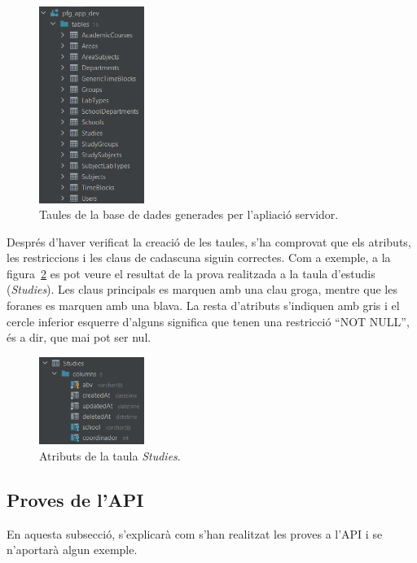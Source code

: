 \documentclass[a4paper,12pt]{ThesisStyle}
\begin{document}
\begin{figure}[H]
  \centering
  \includegraphics[width=0.305\textwidth]{assets/proves/taules.png}
  \caption{\label{img:taules_bdd} Taules de la base de dades generades per l'apliació servidor.}
\end{figure}

Després d'haver verificat la creació de les taules, s'ha comprovat que els atributs, les restriccions i les claus de cadascuna siguin correctes. Com a exemple, a la figura~\ref{img:atributs_taula} es pot veure el resultat de la prova realitzada a la taula d'estudis (\textit{Studies}). Les claus principals es marquen amb una clau groga, mentre que les foranes es marquen amb una blava. La resta d'atributs s'indiquen amb gris i el cercle inferior esquerre d'alguns significa que tenen una restricció ``NOT NULL'', és a dir, que mai pot ser nul.

\begin{figure}[H]
  \centering
  \includegraphics[width=0.305\textwidth]{assets/proves/atributsTaula.png}
  \caption{\label{img:atributs_taula} Atributs de la taula \textit{Studies}.}
\end{figure}

\subsection{Proves de l'API}
\label{subsec:proves_api}

En aquesta subsecció, s'explicarà com s'han realitzat les proves a l'API i se n'aportarà algun exemple.
\end{document}
